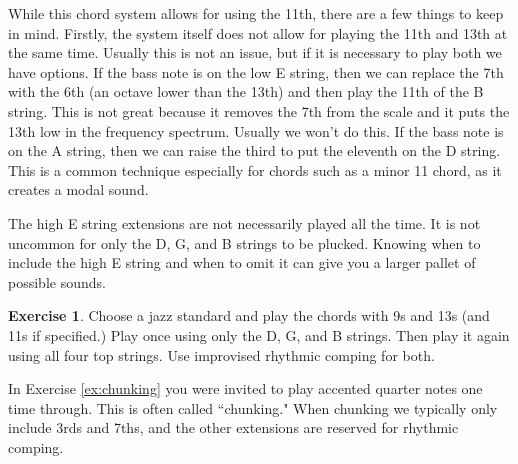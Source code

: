 \documentclass[12pt]{article}
\theoremstyle{definition}
\newtheorem{exercise}{Exercise}
\begin{document}
While this chord system allows for using the 11th, there are a few things to keep in mind. Firstly, the system itself does not allow for playing the 11th and 13th at the same time. Usually this is not an issue, but if it is necessary to play both we have options. If the bass note is on the low E string, then we can replace the 7th with the 6th (an octave lower than the 13th) and then play the 11th of the B string. This is not great because it removes the 7th from the scale and it puts the 13th low in the frequency spectrum. Usually we won't do this. If the bass note is on the A string, then we can raise the third to put the eleventh on the D string. This is a common technique especially for chords such as a minor 11 chord, as it creates a modal sound. 

The high E string extensions are not necessarily played all the time. It is not uncommon for only the D, G, and B strings to be plucked. Knowing when to include the high E string and when to omit it can give you a larger pallet of possible sounds. 

\begin{exercise}
Choose a jazz standard and play the chords with 9s and 13s (and 11s if specified.)
Play once using only the D, G, and B strings. Then play it again using all four top strings. Use improvised rhythmic comping for both. 
\end{exercise}

In Exercise \ref{ex:chunking} you were invited to play accented quarter notes one time through. This is often called ``chunking." When chunking we typically only include 3rds and 7ths, and the other extensions are reserved for rhythmic comping. 
\end{document}
